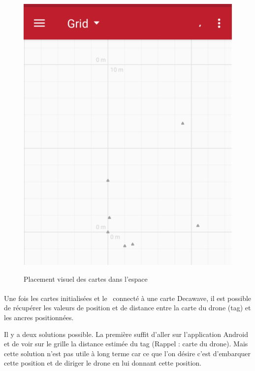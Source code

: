        \begin{minipage}[c]{0.45\linewidth}
            \begin{figure}[H]
                \centering
            	\begin{frame}{\includegraphics[width=1\textwidth]{image/UI_Decawave3.png}}
            	\end{frame}
            	\caption{\label{fig:placementVisuel}Placement visuel des cartes dans l'espace}
            \end{figure}
        \end{minipage}
        
        \paragraph*{}
        Une fois les cartes initialisées et le \rpi ~connecté à une carte Decawave, il est possible de récupérer les valeurs de position et de distance entre la carte du drone (tag) et les ancres positionnées.
        
        Il y a deux solutions possible. La première suffit d'aller sur l'application Android et de voir sur le grille la distance estimée du tag (Rappel : carte du drone). Mais cette solution n'est pas utile à long terme car ce que l'on désire c'est d'embarquer cette position et de diriger le drone en lui donnant cette position.
        
